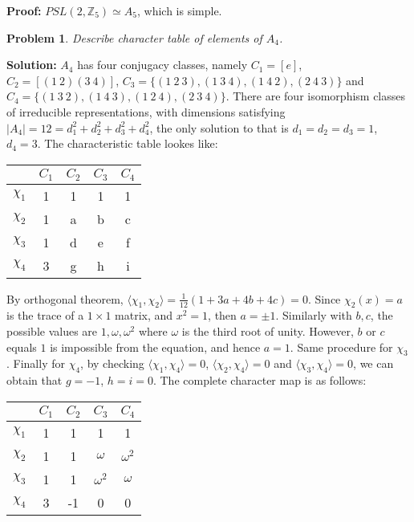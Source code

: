 \documentclass[12pt]{article}
\newtheorem{problem}{Problem}
\begin{document}
\textbf{Proof:} $PSL(2,\mathbb{Z}_5)\simeq A_5$, which is simple. 

\begin{problem}
Describe character table of elements of $A_4$.
\end{problem}

\textbf{Solution:} $A_4$ has four conjugacy classes, namely $C_1=[e]$, $C_2=[(1\ 2)(3\ 4)]$, $C_3=\{(1\ 2\ 3), (1\ 3\ 4), (1\ 4\ 2), (2\ 4\ 3)\}$ and $C_4=\{(1\ 3\ 2), (1\ 4\ 3), (1\ 2\ 4), (2\ 3\ 4)\}$. There are four isomorphism classes of irreducible representations, with dimensions satisfying $|A_4|=12=d_1^2+d_2^2+d_3^2+d_4^2$, the only solution to that is $d_1=d_2=d_3=1$, $d_4=3$. The characteristic table lookes like:
\begin{center}
\begin{tabular}{||c c c c c||} 
 \hline
  & $C_1$ & $C_2$ & $C_3$ & $C_4$ \\ [0.5ex] 
 \hline\hline
 $\chi_1$ & 1 & 1 & 1 & 1 \\ 
 \hline
 $\chi_2$ & 1 & a & b & c \\
 \hline
 $\chi_3$ & 1 & d & e & f \\
 \hline
 $\chi_4$ & 3 & g & h & i \\
 \hline
\end{tabular}
\end{center}
By orthogonal theorem, $\langle\chi_1,\chi_2\rangle = \frac{1}{12}(1+3a+4b+4c)=0$. Since $\chi_2(x)=a$ is the trace of a $1\times 1$ matrix, and $x^2=1$, then $a=\pm 1$. Similarly with $b,c$, the possible values are $1, \omega, \omega^2$ where $\omega$ is the third root of unity. However, $b$ or $c$ equals $1$ is impossible from the equation, and hence $a=1$. Same procedure for $\chi_3$. Finally for $\chi_4$, by checking $\langle\chi_1,\chi_4\rangle=0$, $\langle\chi_2,\chi_4\rangle=0$ and $\langle\chi_3,\chi_4\rangle=0$, we can obtain that $g=-1$, $h=i=0$. The complete character map is as follows:
\begin{center}
\begin{tabular}{||c c c c c||} 
 \hline
  & $C_1$ & $C_2$ & $C_3$ & $C_4$ \\ [0.5ex] 
 \hline\hline
 $\chi_1$ & 1 & 1 & 1 & 1 \\ 
 \hline
 $\chi_2$ & 1 & 1 & $\omega$ & $\omega^2$ \\
 \hline
 $\chi_3$ & 1 & 1 & $\omega^2$ & $\omega$ \\
 \hline
 $\chi_4$ & 3 & -1 & 0 & 0 \\
 \hline
\end{tabular}
\end{center}
\end{document}

